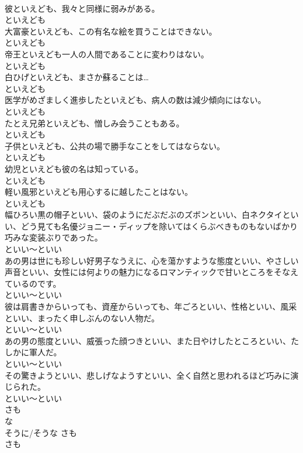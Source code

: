 \documentclass[8pt]{extreport}
\begin{document}
\begin{CJK}{UTF8}{min}
\\	彼といえども、我々と同様に弱みがある。	
\\	といえども	
\\	大富豪といえども、この有名な絵を買うことはできない。	
\\	といえども	
\\	帝王といえども一人の人間であることに変わりはない。	
\\	といえども	
\\	白ひげといえども、まさか蘇ることは…	
\\	といえども	
\\	医学がめざましく進歩したといえども、病人の数は減少傾向にはない。	
\\	といえども	
\\	たとえ兄弟といえども、憎しみ会うこともある。	
\\	といえども	
\\	子供といえども、公共の場で勝手なことをしてはならない。	
\\	といえども	
\\	幼児といえども彼の名は知っている。	
\\	といえども	
\\	軽い風邪といえども用心するに越したことはない。	
\\	といえども	
\\	幅ひろい黒の帽子といい、袋のようにだぶだぶのズボンといい、白ネクタイといい、どう見ても名優ジョニー・ディップを除いてはくらぶべきものもないばかり巧みな変装ぶりであった。	
\\	といい～といい	
\\	あの男は世にも珍しい好男子なうえに、心を蕩かすような態度といい、やさしい声音といい、女性には何よりの魅力になるロマンティックで甘いところをそなえているのです。	
\\	といい～といい	
\\	彼は肩書きからいっても、資産からいっても、年ごろといい、性格といい、風采といい、まったく申しぶんのない人物だ。	
\\	といい～といい	
\\	あの男の態度といい、威張った顔つきといい、また日やけしたところといい、たしかに軍人だ。	
\\	といい～といい	
\\	その驚きようといい、悲しげなようすといい、全く自然と思われるほど巧みに演じられた。	
\\	といい～といい	
\\	さも 
\\	な
\\	そうに/そうな	さも 
\\	さも 

\end{CJK}
\end{document}
